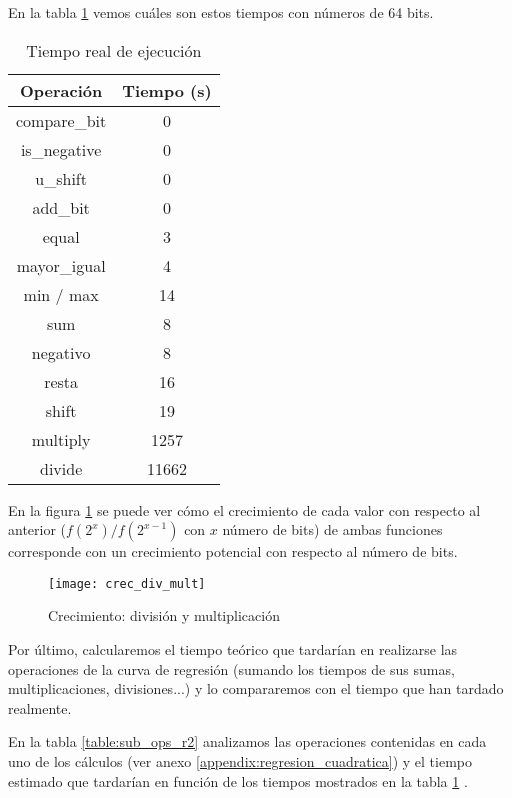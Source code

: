 En la tabla \ref{table:ops_real_time} vemos cuáles son estos tiempos con números de 64 bits.

\begin{table}[]
    \centering
    \begin{tabular}{cc}
        Operación       & Tiempo (s) \\
        \hline \hline
        compare\_bit     & 0 \\
        is\_negative     & 0 \\
        u\_shift       & 0 \\
        add\_bit & 0 \\
        equal   & 3 \\
        mayor\_igual     & 4 \\
        min / max & 14 \\
        sum     & 8 \\
        negativo        & 8 \\
        resta   & 16 \\
        shift   & 19 \\
        multiply        & 1257 \\
        divide  & 11662
    \end{tabular}
    \caption{Tiempo real de ejecución}
    \label{table:ops_real_time}
\end{table}

En la figura \ref{fig:crec_div_mult} se puede ver cómo el crecimiento de cada valor con respecto al anterior  ($f(2^x)/f(2^{x-1})$ con $x$ número de bits) de ambas funciones corresponde con un crecimiento potencial con respecto al número de bits.

\begin{figure}[h]
    \texttt{[image: crec\_div\_mult]}
    \caption{Crecimiento: división y multiplicación}
    \label{fig:crec_div_mult}
\end{figure}

Por último, calcularemos el tiempo teórico que tardarían en realizarse las operaciones de la curva de regresión (sumando los tiempos de sus sumas, multiplicaciones, divisiones...) y lo compararemos con el tiempo que han tardado realmente.

En la tabla \ref{table:sub_ops_r2} analizamos las operaciones contenidas en cada uno de los cálculos (ver anexo \ref{appendix:regresion_cuadratica}) y el tiempo estimado que tardarían en función de los tiempos mostrados en la tabla \ref{table:ops_real_time} .

